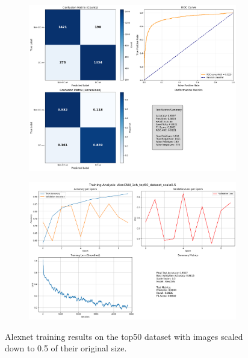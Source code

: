 \documentclass{pracalicmgr}
\begin{document}
\newpage

\begin{figure}[H]
    \centering
    \begin{subfigure}{0.9\textwidth}
        \centering
        \includegraphics[width=\textwidth]{src/AlexCNN_1ch_top50_dataset_scale0.5.png}
        \label{fig:top5005sub1}
    \end{subfigure}
    
    \vspace{1cm}
    
    \begin{subfigure}{0.9\textwidth}
        \centering
        \includegraphics[width=\textwidth]{src/AlexCNN_1ch_top50_dataset_scale05losses.png}
        \label{fig:top5005sub2}
    \end{subfigure}
    \caption{Alexnet training results on the top50 dataset with images scaled down to 0.5 of their original size.}
    \label{fig:top5005stacked}
\end{figure}
\end{document}
